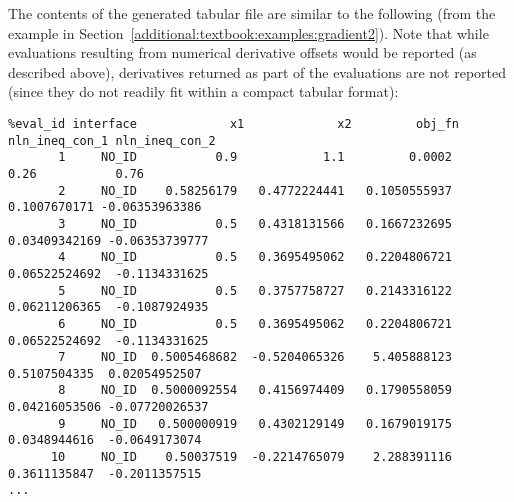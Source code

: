 The contents of the generated tabular file are similar to the following 
(from the example in Section~\ref{additional:textbook:examples:gradient2}).
Note that while evaluations resulting from numerical derivative offsets would be
reported (as described above), derivatives returned as part of the
evaluations are not reported (since they do not readily fit within a
compact tabular format):
\begin{footnotesize}
\begin{verbatim}
%eval_id interface             x1             x2         obj_fn nln_ineq_con_1 nln_ineq_con_2 
       1     NO_ID           0.9            1.1         0.0002           0.26           0.76 
       2     NO_ID    0.58256179   0.4772224441   0.1050555937   0.1007670171 -0.06353963386 
       3     NO_ID           0.5   0.4318131566   0.1667232695  0.03409342169 -0.06353739777 
       4     NO_ID           0.5   0.3695495062   0.2204806721  0.06522524692  -0.1134331625 
       5     NO_ID           0.5   0.3757758727   0.2143316122  0.06211206365  -0.1087924935 
       6     NO_ID           0.5   0.3695495062   0.2204806721  0.06522524692  -0.1134331625 
       7     NO_ID  0.5005468682  -0.5204065326    5.405888123   0.5107504335  0.02054952507 
       8     NO_ID  0.5000092554   0.4156974409   0.1790558059  0.04216053506 -0.07720026537 
       9     NO_ID   0.500000919   0.4302129149   0.1679019175   0.0348944616  -0.0649173074 
      10     NO_ID    0.50037519  -0.2214765079    2.288391116   0.3611135847  -0.2011357515 
...
 \end{verbatim}
\end{footnotesize}

